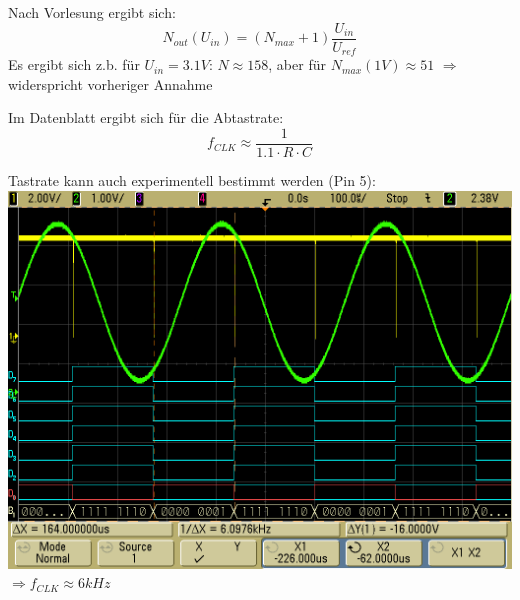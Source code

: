 \documentclass[compress,11pt]{beamer}
\begin{document}
\begin{frame}
\begin{block}
Nach Vorlesung ergibt sich: 
\begin{equation}
N_{out} (U_{in}) = (N_{max} + 1)\frac{U_{in}}{U_{ref}}
\end{equation}
Es ergibt sich z.b. für $U_{in} = 3.1 V$: $N \approx 158$, aber für $N_{max} (1 V) \approx 51$ $\Rightarrow$ widerspricht vorheriger Annahme 
\end{block}
\end{frame}




\begin{frame}
Im Datenblatt ergibt sich für die Abtastrate: 
\begin{equation}
f_{CLK} \approx \frac{1}{1.1 \cdot R \cdot C} 
\end{equation}
\end{frame}
\begin{frame}
Tastrate kann auch experimentell bestimmt werden (Pin 5):\\
\includegraphics[width=.7\textwidth]{../vales_zeug/scope_125}\\
$\Rightarrow f_{CLK} \approx 6 kHz$
\end{frame}
\end{document}
